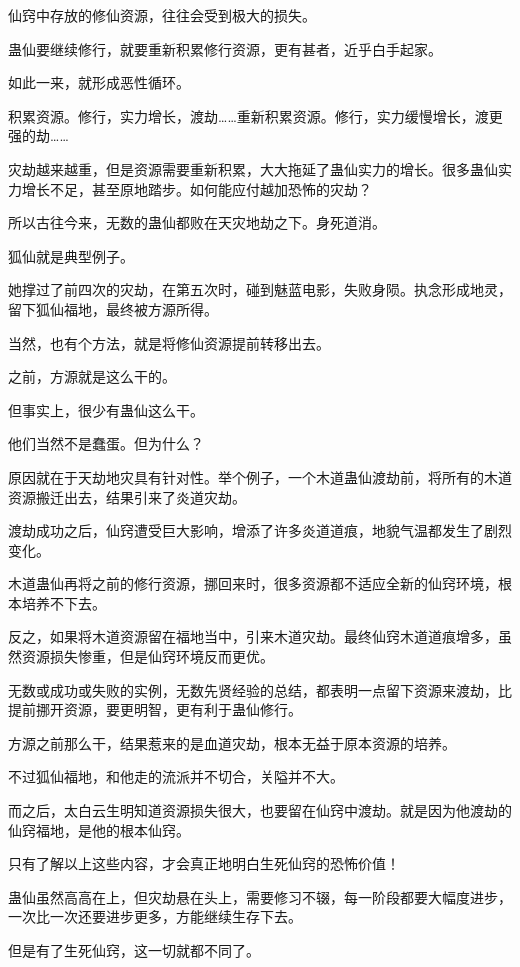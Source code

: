 \begin{this_body}
仙窍中存放的修仙资源，往往会受到极大的损失。

蛊仙要继续修行，就要重新积累修行资源，更有甚者，近乎白手起家。

如此一来，就形成恶性循环。

积累资源。修行，实力增长，渡劫……重新积累资源。修行，实力缓慢增长，渡更强的劫……

灾劫越来越重，但是资源需要重新积累，大大拖延了蛊仙实力的增长。很多蛊仙实力增长不足，甚至原地踏步。如何能应付越加恐怖的灾劫？

所以古往今来，无数的蛊仙都败在天灾地劫之下。身死道消。

狐仙就是典型例子。

她撑过了前四次的灾劫，在第五次时，碰到魅蓝电影，失败身陨。执念形成地灵，留下狐仙福地，最终被方源所得。

当然，也有个方法，就是将修仙资源提前转移出去。

之前，方源就是这么干的。

但事实上，很少有蛊仙这么干。

他们当然不是蠢蛋。但为什么？

原因就在于天劫地灾具有针对性。举个例子，一个木道蛊仙渡劫前，将所有的木道资源搬迁出去，结果引来了炎道灾劫。

渡劫成功之后，仙窍遭受巨大影响，增添了许多炎道道痕，地貌气温都发生了剧烈变化。

木道蛊仙再将之前的修行资源，挪回来时，很多资源都不适应全新的仙窍环境，根本培养不下去。

反之，如果将木道资源留在福地当中，引来木道灾劫。最终仙窍木道道痕增多，虽然资源损失惨重，但是仙窍环境反而更优。

无数或成功或失败的实例，无数先贤经验的总结，都表明一点留下资源来渡劫，比提前挪开资源，要更明智，更有利于蛊仙修行。

方源之前那么干，结果惹来的是血道灾劫，根本无益于原本资源的培养。

不过狐仙福地，和他走的流派并不切合，关隘并不大。

而之后，太白云生明知道资源损失很大，也要留在仙窍中渡劫。就是因为他渡劫的仙窍福地，是他的根本仙窍。

只有了解以上这些内容，才会真正地明白生死仙窍的恐怖价值！

蛊仙虽然高高在上，但灾劫悬在头上，需要修习不辍，每一阶段都要大幅度进步，一次比一次还要进步更多，方能继续生存下去。

但是有了生死仙窍，这一切就都不同了。


\end{this_body}
